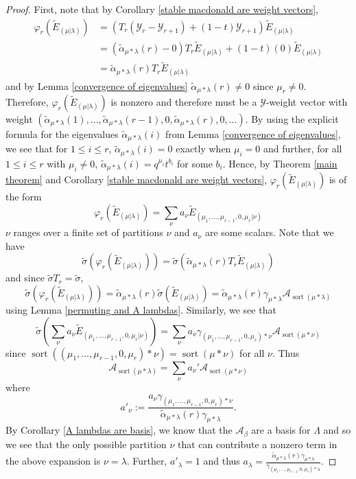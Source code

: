 \documentclass[11pt]{article}
\theoremstyle{definition}
\numberwithin{equation}{section}
\newcommand{\y}{{ \mathscr{Y} }}
\DeclareMathOperator{\sort}{sort}
\begin{document}
\begin{proof}
First, note that by Corollary \ref{stable macdonald are weight vectors},
\begin{align*}
    \varphi_r(\widetilde{E}_{(\mu|\lambda)}) &= (T_r(\y_r-\y_{r+1})+(1-t)\y_{r+1})\widetilde{E}_{(\mu|\lambda)} \\
    &= (\widetilde{\alpha}_{\mu*\lambda}(r)-0)T_r\widetilde{E}_{(\mu|\lambda)} + (1-t)(0)\widetilde{E}_{(\mu|\lambda)}\\
    &= \widetilde{\alpha}_{\mu*\lambda}(r)T_r\widetilde{E}_{(\mu|\lambda)}
\end{align*}
and by Lemma \ref{convergence of eigenvalues} $\widetilde{\alpha}_{\mu*\lambda}(r) \neq 0$ since $\mu_r \neq 0$. Therefore, $\varphi_r(\widetilde{E}_{(\mu|\lambda)})$ is nonzero and therefore must be a $\y$-weight vector with weight $(\widetilde{\alpha}_{\mu*\lambda}(1),\ldots,\widetilde{\alpha}_{\mu*\lambda}(r-1),0,\widetilde{\alpha}_{\mu*\lambda}(r), 0,\ldots)$. By using the explicit formula for the eigenvalues $\widetilde{\alpha}_{\mu*\lambda}(i)$ from Lemma \ref{convergence of eigenvalues}, we see that for $1 \leq i \leq r$, $\widetilde{\alpha}_{\mu*\lambda}(i) = 0$ exactly when $\mu_i = 0$ and further, for all $1 \leq i \leq r$ with $\mu_i \neq 0$, $\widetilde{\alpha}_{\mu*\lambda}(i) = q^{\mu_i}t^{b_i}$ for some $b_i$. Hence, by Theorem \ref{main theorem} and Corollary \ref{stable macdonald are weight vectors}, $\varphi_r(\widetilde{E}_{(\mu|\lambda)})$ is of the form 
$$\varphi_r(\widetilde{E}_{(\mu|\lambda)}) = \sum_{\nu} a_{\nu} \widetilde{E}_{(\mu_1,\ldots,\mu_{r-1},0,\mu_r|\nu)}$$
$\nu$ ranges over a finite set of partitions $\nu$ and $a_{\nu}$ are some scalars. 
Note that we have 
$$\widetilde{\sigma}(\varphi_r(\widetilde{E}_{(\mu|\lambda)})) =  \widetilde{\sigma}(\widetilde{\alpha}_{\mu*\lambda}(r)T_r\widetilde{E}_{(\mu|\lambda)}) $$ and since $\widetilde{\sigma}T_r = \widetilde{\sigma},$ $$\widetilde{\sigma}(\varphi_r(\widetilde{E}_{(\mu|\lambda)}))= \widetilde{\alpha}_{\mu*\lambda}(r)\widetilde{\sigma}(\widetilde{E}_{(\mu|\lambda)}) = \widetilde{\alpha}_{\mu*\lambda}(r) \gamma_{\mu*\lambda} \mathcal{A}_{\sort(\mu*\lambda)}$$ 
using Lemma \ref{permuting and A lambdas}. 
Similarly, we see that 
$$\widetilde{\sigma}\left( \sum_{\nu} a_{\nu} \widetilde{E}_{(\mu_1,\ldots,\mu_{r-1},0,\mu_r|\nu)}   \right) = \sum_{\nu} a_{\nu} \gamma_{(\mu_1,\ldots,\mu_{r-1},0,\mu_r)*\nu} \mathcal{A}_{\sort(\mu*\nu)}$$
since $\sort((\mu_1,\ldots,\mu_{r-1},0,\mu_r)*\nu) = \sort(\mu*\nu)$ for all $\nu.$ Thus
$$\mathcal{A}_{\sort(\mu*\lambda)} = \sum_{\nu} a_{\nu}' \mathcal{A}_{\sort(\mu*\nu)} $$
where $$a'_{\nu}:= \frac{a_{\nu}\gamma_{(\mu_1,\ldots,\mu_{r-1},0,\mu_r)*\nu}}{\widetilde{\alpha}_{\mu*\lambda}(r)\gamma_{\mu*\lambda}}.$$ By Corollary \ref{A lambdas are basis}, we know that the $\mathcal{A}_{\beta}$ are a basis for $\Lambda$ and so we see that the only possible partition $\nu$ that can contribute a nonzero term in the above expansion is $\nu = \lambda$. Further, $a'_{\lambda} = 1$ and thus $a_{\lambda} = \frac{\widetilde{\alpha}_{\mu*\lambda}(r)\gamma_{\mu*\lambda}}{\gamma_{(\mu_1,\ldots,\mu_{r-1},0,\mu_r)*\lambda}}.$


\end{proof}
\end{document}
